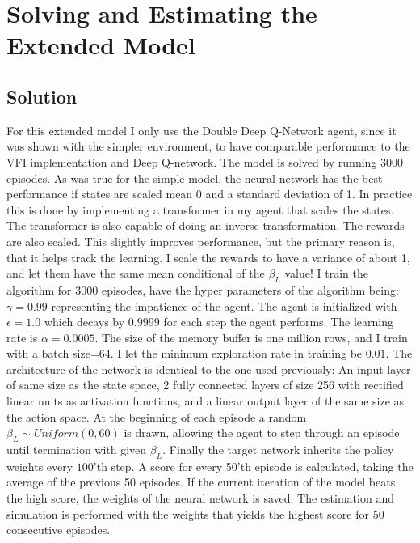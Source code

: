 \section{Solving and Estimating the Extended Model}

\subsection{Solution}

For this extended model I only use the Double Deep Q-Network agent, since it was shown with the simpler environment, to have comparable performance to the VFI implementation and Deep Q-network. The model is solved by running 3000 episodes. As was true for the simple model, the neural network has the best performance if states are scaled mean 0 and a standard deviation of 1. In practice this is done by implementing a transformer in my agent that scales the states.  The transformer is also capable of doing an inverse transformation. The rewards are also scaled. This slightly improves performance, but the primary reason is, that it helps track the learning. I scale the rewards to have a variance of about 1, and let them have the same mean conditional of the $\beta_L$  value! I train the algorithm for 3000 episodes, have the hyper parameters of the algorithm being: $\gamma=0.99$ representing the impatience of the agent. The agent is initialized with $\epsilon=1.0$ which decays by $0.9999$ for each step the agent performs. The learning rate is $\alpha=0.0005$. The size of the memory buffer is one million rows, and I train with a batch size=64. I let the minimum exploration rate in training be $0.01$.  The architecture of the network is identical to the one used previously: An input layer of same size as the state space, 2 fully connected layers of size 256 with rectified linear units as activation functions, and a linear output layer of the same size as the action space. At the beginning of each episode a random $\beta_L \sim Uniform(0, 60)$ is drawn, allowing the agent to step through an episode until termination with given $\beta_L$. Finally the target network inherits the policy weights every $100$'th step. A score for every 50'th episode is calculated, taking the average of the previous 50 episodes. If the current iteration of the model beats the high score, the weights of the neural network is saved. The estimation and simulation is performed with the weights that yields the highest score for 50 consecutive episodes. 

